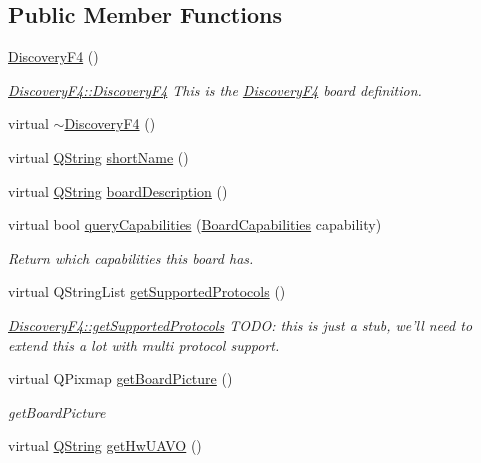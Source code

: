 \subsection*{\-Public \-Member \-Functions}
\begin{DoxyCompactItemize}
\item 
\hyperlink{group___boards___stm_gac87884749e97c313a7ae0f297c4fea34}{\-Discovery\-F4} ()
\begin{DoxyCompactList}\small\item\em \hyperlink{group___boards___stm_gac87884749e97c313a7ae0f297c4fea34}{\-Discovery\-F4\-::\-Discovery\-F4} \-This is the \hyperlink{class_discovery_f4}{\-Discovery\-F4} board definition. \end{DoxyCompactList}\item 
virtual \hyperlink{group___boards___stm_ga9efdcb4c04776b36e256d689941943ea}{$\sim$\-Discovery\-F4} ()
\item 
virtual \hyperlink{group___u_a_v_objects_plugin_gab9d252f49c333c94a72f97ce3105a32d}{\-Q\-String} \hyperlink{group___boards___stm_ga5c9636450b313e75d14d0277542ca1b7}{short\-Name} ()
\item 
virtual \hyperlink{group___u_a_v_objects_plugin_gab9d252f49c333c94a72f97ce3105a32d}{\-Q\-String} \hyperlink{group___boards___stm_gaaa661c5a3b6c7fe84f8736ce1c090860}{board\-Description} ()
\item 
virtual bool \hyperlink{group___boards___stm_ga81561678eef8f622b3cfe9f7af2aa762}{query\-Capabilities} (\hyperlink{group___core_plugin_ga01b09218f2a13aaeee6db007ac6bd967}{\-Board\-Capabilities} capability)
\begin{DoxyCompactList}\small\item\em \-Return which capabilities this board has. \end{DoxyCompactList}\item 
virtual \-Q\-String\-List \hyperlink{group___boards___stm_ga1db1bd4a572120a9b4224f4eb643ef2f}{get\-Supported\-Protocols} ()
\begin{DoxyCompactList}\small\item\em \hyperlink{group___boards___stm_ga1db1bd4a572120a9b4224f4eb643ef2f}{\-Discovery\-F4\-::get\-Supported\-Protocols} \-T\-O\-D\-O\-: this is just a stub, we'll need to extend this a lot with multi protocol support. \end{DoxyCompactList}\item 
virtual \-Q\-Pixmap \hyperlink{group___boards___stm_gaec756cbf9ef744354fcb5eb274ba2b94}{get\-Board\-Picture} ()
\begin{DoxyCompactList}\small\item\em get\-Board\-Picture \end{DoxyCompactList}\item 
virtual \hyperlink{group___u_a_v_objects_plugin_gab9d252f49c333c94a72f97ce3105a32d}{\-Q\-String} \hyperlink{group___boards___stm_gad4fb3147a8ceb8b1106048d7b44d92e9}{get\-Hw\-U\-A\-V\-O} ()
\end{DoxyCompactItemize}


